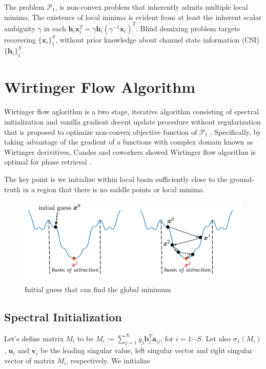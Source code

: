 The problem $\mathcal{P}_1$, is non-convex problem that inherently admits multiple local minima. The existence of local minima is evident from at least the inherent scalar ambiguity 
$\gamma$ in each $\mathbf{h}_i \mathbf{x}_i^T = \gamma \mathbf{h}_i(\gamma^{-1}\mathbf{x}_i)^T$. Blind demixing problem targets recovering $\{\mathbf{x}_i\}_1^S$, without prior knowledge about channel state information (CSI) $\{\mathbf{h}_i\}_1^S$. 

\section{Wirtinger Flow Algorithm}
Wirtinger flow aglorithm is a two stage, iterative algorithm consisting of spectral initialization and vanilla gradient decent update 
procedure without regularization that is proposed to optimize non-convex objective function of $\mathcal{P}_1$  \cite{dong2018nonconvex }.
Specifically, by taking advantage of the gradient of a functions with  complex domain known as Wirtinger derivitives, Candes and coworkers  showed Wirtinger flow algorithm is optimal for phase retrieval \cite{candes2015phase}. 

The key point is we initialize within local basin sufficiently close to the ground-truth in a region that there is no saddle points or local minima.

\begin{figure}[h]
\centering
\includegraphics[scale = 0.6]{figs/wf_localbasin}
\caption{Initial guess that can find the global minimum}
\end{figure}


\subsection{Spectral Initialization}
Let's define matrix $M_i$ to be $M_i := \sum_{j=1}^{N}{y_j} \mathbf{b}_j^T \mathbf{a}_{ij} $, for $i = 1 \cdots S$. Let also $\sigma_1(M_i)$,
$\mathbf{u}_i$ and $\mathbf{v}_i$ be the leading singular value, left singular vector and right singular vector of matrix $M_i$, respectively.
We initialize 

